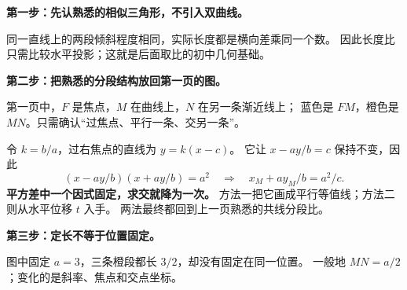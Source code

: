 \clearpage
\begin{explanationbox}
\textbf{第一步：先认熟悉的相似三角形，不引入双曲线。}
\begin{center}\end{center}
同一直线上的两段倾斜程度相同，实际长度都是横向差乘同一个数。
因此长度比只需比较水平投影；这就是后面取比的初中几何基础。
\end{explanationbox}
\clearpage
\begin{explanationbox}
\textbf{第二步：把熟悉的分段结构放回第一页的图。}

第一页中，$F$ 是焦点，$M$ 在曲线上，$N$ 在另一条渐近线上；
蓝色是 $FM$，橙色是 $MN$。只需确认“过焦点、平行一条、交另一条”。

令 $k=b/a$，过右焦点的直线为 $y=k(x-c)$。
它让 $x-ay/b=c$ 保持不变，因此
\[
 (x-ay/b)(x+ay/b)=a^2
 \quad\Longrightarrow\quad x_M+ay_M/b=a^2/c.
\]
\textbf{平方差中一个因式固定，求交就降为一次。}
方法一把它画成平行等值线；方法二则从水平位移 $t$ 入手。
两法最终都回到上一页熟悉的共线分段比。

\medskip
\textbf{第三步：定长不等于位置固定。}
\begin{center}\end{center}
图中固定 $a=3$，三条橙段都长 $3/2$，却没有固定在同一位置。
一般地 $MN=a/2$；变化的是斜率、焦点和交点坐标。
\end{explanationbox}
